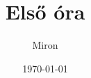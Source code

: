 \documentclass{book}
\title{Első óra}
\author{Miron}
\date{\today}
\begin{document}
\maketitle
\hulipsum
\end{document}
